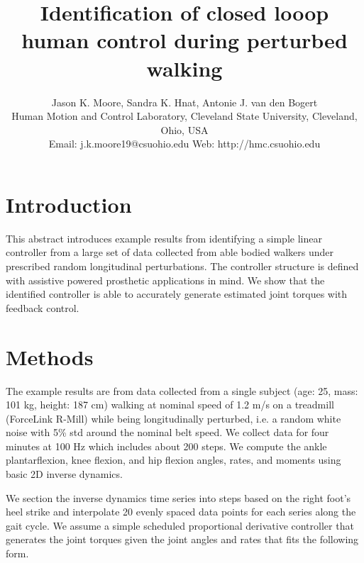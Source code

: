 \documentclass[10pt,letterpaper,notitlepage]{article}
\title{Identification of closed looop human control during perturbed walking}
\author{
  Jason K. Moore, Sandra K. Hnat, Antonie J. van den Bogert\\
  Human Motion and Control Laboratory, Cleveland State University, Cleveland, Ohio, USA\\
  Email: j.k.moore19@csuohio.edu Web: http://hmc.csuohio.edu
}
\date{}
\begin{document}

\maketitle

\section*{Introduction}
%
This abstract introduces example results from identifying a simple linear
controller from a large set of data collected from able bodied walkers under
prescribed random longitudinal perturbations. The controller structure is
defined with assistive powered prosthetic applications in mind. We show that
the identified controller is able to accurately generate estimated joint
torques with feedback control.
%
\section*{Methods}
%
The example results are from data collected from a single subject (age: 25,
mass: 101 kg, height: 187 cm) walking at nominal speed of 1.2 m/s on a
treadmill (ForceLink R-Mill) while being longitudinally perturbed, i.e. a
random white noise with 5\% std around the nominal belt speed. We collect data
for four minutes at 100 Hz which includes about 200 steps. We compute the ankle
plantarflexion, knee flexion, and hip flexion angles, rates, and moments using
basic 2D inverse dynamics.

We section the inverse dynamics time series into steps based on the right
foot's heel strike and interpolate 20 evenly spaced data points for each series
along the gait cycle. We assume a simple scheduled proportional derivative
controller that generates the joint torques given the joint angles and rates
that fits the following form.
\end{document}
